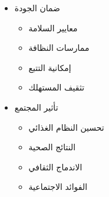 \begin{itemize}
\begin{itemize}
        \item ضمان الجودة
        \begin{itemize}
            \item معايير السلامة
            \item ممارسات النظافة
            \item إمكانية التتبع
            \item تثقيف المستهلك
        \end{itemize}
        
        \item تأثير المجتمع
        \begin{itemize}
            \item تحسين النظام الغذائي
            \item النتائج الصحية
            \item الاندماج الثقافي
            \item الفوائد الاجتماعية
        \end{itemize}
    \end{itemize}
\end{itemize}

